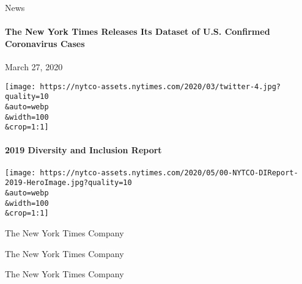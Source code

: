 \href{https://www.nytco.com/press/the-new-york-times-releases-its-dataset-of-u-s-confirmed-coronavirus-cases/}{}

 News

\hypertarget{the-new-york-times-releases-its-dataset-of-us-confirmed-coronavirus-cases}{%
\paragraph{The New York Times Releases Its Dataset of U.S. Confirmed
Coronavirus
Cases}\label{the-new-york-times-releases-its-dataset-of-us-confirmed-coronavirus-cases}}

March 27, 2020

\texttt{[image: https://nytco-assets.nytimes.com/2020/03/twitter-4.jpg?quality=10\\\&auto=webp\\\&width=100\\\&crop=1:1]}

\href{https://www.nytco.com/company/diversity-and-inclusion/2019-diversity-and-inclusion-report/}{}

\hypertarget{2019-diversity-and-inclusion-report}{%
\paragraph{2019 Diversity and Inclusion
Report}\label{2019-diversity-and-inclusion-report}}

\texttt{[image: https://nytco-assets.nytimes.com/2020/05/00-NYTCO-DIReport-2019-HeroImage.jpg?quality=10\\\&auto=webp\\\&width=100\\\&crop=1:1]}

The New York Times Company

The New York Times Company

The New York Times Company

